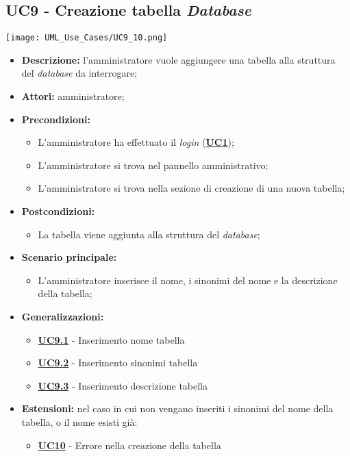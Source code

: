 \subsection{UC9 - Creazione tabella \textit{Database}}
\label{sec:UC9}
\texttt{[image: UML\_Use\_Cases/UC9\_10.png]}
\begin{itemize}
	\item \textbf{Descrizione:} l’amministratore vuole aggiungere una tabella alla struttura del \textit{database} da interrogare;
	\item \textbf{Attori:} amministratore;
	\item \textbf{Precondizioni:} 
	\begin{itemize}
		\item L’amministratore ha effettuato il \textit{login} (\hyperref[sec:UC1]{\textbf{UC1}});
		\item L’amministratore si trova nel pannello amministrativo;
		\item L’amministratore si trova nella sezione di creazione di una nuova tabella;
	\end{itemize}
	\item \textbf{Postcondizioni:} 
	\begin{itemize}
		\item La tabella viene aggiunta alla struttura del \textit{database};
	\end{itemize}
	\item \textbf{Scenario principale:} 
	\begin{itemize}
		\item L’amministratore inserisce il nome, i sinonimi del nome e la descrizione della tabella;
	\end{itemize}
	\item \textbf{Generalizzazioni:} 
	\begin{itemize}
		\item \hyperref[sec:UC9.1]{\textbf{UC9.1}} - Inserimento nome tabella
		\item \hyperref[sec:UC9.2]{\textbf{UC9.2}} - Inserimento sinonimi tabella
		\item \hyperref[sec:UC9.3]{\textbf{UC9.3}} - Inserimento descrizione tabella
	\end{itemize}
	\item \textbf{Estensioni:} nel caso in cui non vengano inseriti i sinonimi del nome della tabella, o il nome esisti già:
	\begin{itemize}
		\item \hyperref[sec:UC10]{\textbf{UC10}} - Errore nella creazione della tabella
	\end{itemize}
\end{itemize}

